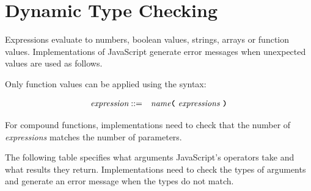 
\section{Dynamic Type Checking}

Expressions evaluate to numbers, boolean values, strings, arrays or function values. Implementations
of JavaScript generate error messages when unexpected values are used as follows.

Only function values can be applied using the syntax:

\begin{eqnarray*}
 \textit{expression}    
                                   & ::=   &  \textit{name}
                                               \texttt{\textbf{(}}\  \textit{expressions} \
                                               \texttt{\textbf{)}}\\ 
\end{eqnarray*}

For compound functions, implementations need to check that the number of \textit{expressions}
matches the number of parameters.

The following table specifies what arguments JavaScript's operators
take and what results they return. Implementations need to check the types of arguments and
generate an error message when the types do not match.


